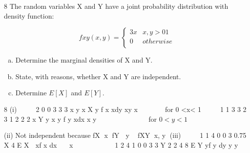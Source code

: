 \documentclass[a4paper,12pt]{article}
\begin{document}
8
The random variables X and Y have a joint probability distribution with density
function:

\[
f xy ( x , y ) = \begin{cases}
3x & x,y >0 1\\
0 & otherwise\\
\end{cases}
\]
\begin{enumerate}[(a)]
\item Determine the marginal densities of X and Y.
\item State, with reasons, whether X and Y are independent.
\item Determine $E[X]$ and $E[Y]$.
\end{enumerate}

\newpage
\item 8 (i)     2
  0
  0
  3 3 3
  x
  y x
  X y f x xdy xy x 
       for 0 <x< 1
      1 1
  3 3 2 3 1 2
  2 2
  x
  Y
  y x y
  f y xdx x y
  
  
           for $0 <y< 1$
 \item  (ii) Not independent because fX x fY  y  fXY x, y
  (iii)    
  1 1
  4
  0 0
  3 0.75
  X 4 E X  xf x dx   x     
     
  1 2 4 1
  0 0
  3 3
  Y 2 2 4 8
  E Y yf y dy y y
    
           
  
\end{document}
